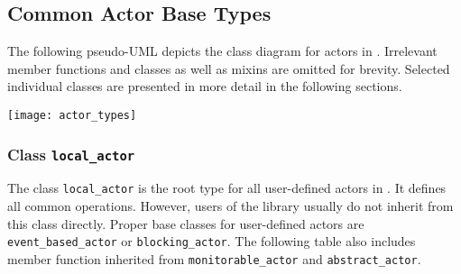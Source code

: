 \clearpage
\subsection{Common Actor Base Types}

The following pseudo-UML depicts the class diagram for actors in \lib.
Irrelevant member functions and classes as well as mixins are omitted for
brevity. Selected individual classes are presented in more detail in the
following sections.

\texttt{[image: actor\_types]}

\clearpage
\subsubsection{Class \lstinline^local_actor^}

The class \lstinline^local_actor^ is the root type for all user-defined actors
in \lib. It defines all common operations. However, users of the library
usually do not inherit from this class directly. Proper base classes for
user-defined actors are \lstinline^event_based_actor^ or
\lstinline^blocking_actor^. The following table also includes member function
inherited from \lstinline^monitorable_actor^ and \lstinline^abstract_actor^.

